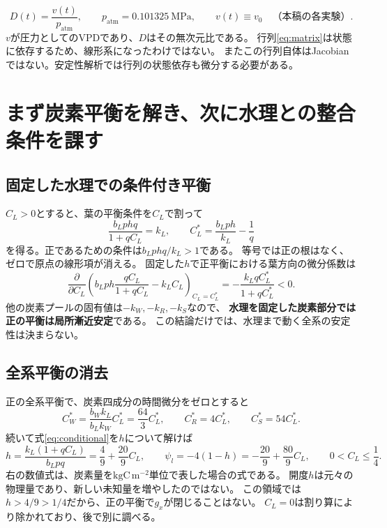 \documentclass[a4paper,11pt]{ltjsarticle}
\begin{document}
\begin{equation}
 \boxed{D(t)=\frac{v(t)}{p_{\mathrm{atm}}},\qquad
 p_{\mathrm{atm}}=0.101325\ \mathrm{MPa},\qquad
 v(t)\equiv v_0\quad\text{（本稿の各実験）}.}
\end{equation}
$v$が圧力としてのVPDであり、$D$はその無次元比である。
行列\eqref{eq:matrix}は状態に依存するため、線形系になったわけではない。
またこの行列自体はJacobianではない。安定性解析では行列の状態依存も微分する必要がある。

\section{まず炭素平衡を解き、次に水理との整合条件を課す}
\subsection{固定した水理での条件付き平衡}
$C_L>0$とすると、葉の平衡条件を$C_L$で割って
\begin{equation}\label{eq:conditional}
 \frac{b_Lp hq}{1+qC_L}=k_L,\qquad
 \boxed{C_L^*=\frac{b_Lp h}{k_L}-\frac1q}
\end{equation}
を得る。正であるための条件は$b_Lp hq/k_L>1$である。
等号では正の根はなく、ゼロで原点の線形項が消える。
固定した$h$で正平衡における葉方向の微分係数は
\begin{equation}
 \frac{\partial}{\partial C_L}
 \left(b_Lp h\frac{qC_L}{1+qC_L}-k_LC_L\right)_{\!C_L=C_L^*}
 =-\frac{k_LqC_L^*}{1+qC_L^*}<0.
\end{equation}
他の炭素プールの固有値は$-k_W,-k_R,-k_S$なので、
\textbf{水理を固定した炭素部分では正の平衡は局所漸近安定}である。
この結論だけでは、水理まで動く全系の安定性は決まらない。

\subsection{全系平衡の消去}
正の全系平衡で、炭素四成分の時間微分をゼロとすると
\begin{equation}\label{eq:stocks}
 C_W^*=\frac{b_Wk_L}{b_Lk_W}C_L^*=\frac{64}{3}C_L^*,\qquad
 C_R^*=4C_L^*,\qquad C_S^*=54C_L^* .
\end{equation}
続いて式\eqref{eq:conditional}を$h$について解けば
\begin{equation}\label{eq:waterleaf}
 h=\frac{k_L(1+qC_L)}{b_Lpq}=\frac49+\frac{20}{9}C_L,\qquad
 \psi_l=-4(1-h)=-\frac{20}{9}+\frac{80}{9}C_L,\qquad
 \boxed{0<C_L\leq\frac14}.
\end{equation}
右の数値式は、炭素量を$\mathrm{kgC\,m^{-2}}$単位で表した場合の式である。
開度$h$は元々の物理量であり、新しい未知量を増やしたのではない。
この領域では$h>4/9>1/4$だから、正の平衡で$g_x$が閉じることはない。
$C_L=0$は割り算により除かれており、後で別に調べる。
\end{document}
